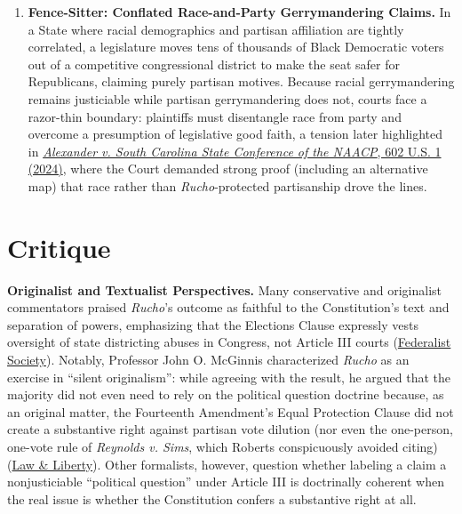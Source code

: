 \documentclass[12pt]{article}
\begin{document}
\begin{enumerate}
\item \textbf{Fence-Sitter: Conflated Race-and-Party Gerrymandering Claims.} In a State where racial demographics and partisan affiliation are tightly correlated, a legislature moves tens of thousands of Black Democratic voters out of a competitive congressional district to make the seat safer for Republicans, claiming purely partisan motives. Because racial gerrymandering remains justiciable while partisan gerrymandering does not, courts face a razor-thin boundary: plaintiffs must disentangle race from party and overcome a presumption of legislative good faith, a tension later highlighted in \href{https://www.acslaw.org/scotus_update/alexander-v-south-carolina-state-conference-of-the-naacp/}{\textit{Alexander v. South Carolina State Conference of the NAACP}, 602 U.S. 1 (2024)}, where the Court demanded strong proof (including an alternative map) that race rather than \textit{Rucho}-protected partisanship drove the lines.
\end{enumerate}

\section{Critique}

\textbf{Originalist and Textualist Perspectives.} Many conservative and originalist commentators praised \textit{Rucho}'s outcome as faithful to the Constitution's text and separation of powers, emphasizing that the Elections Clause expressly vests oversight of state districting abuses in Congress, not Article III courts (\href{https://fedsoc.org/case/rucho-v-common-cause}{Federalist Society}). Notably, Professor John O. McGinnis characterized \textit{Rucho} as an exercise in ``silent originalism'': while agreeing with the result, he argued that the majority did not even need to rely on the political question doctrine because, as an original matter, the Fourteenth Amendment's Equal Protection Clause did not create a substantive right against partisan vote dilution (nor even the one-person, one-vote rule of \textit{Reynolds v. Sims}, which Roberts conspicuously avoided citing) (\href{https://lawliberty.org/silent-originalism-and-the-reweighting-of-precedent/}{Law \& Liberty}). Other formalists, however, question whether labeling a claim a nonjusticiable ``political question'' under Article III is doctrinally coherent when the real issue is whether the Constitution confers a substantive right at all.
\end{document}

